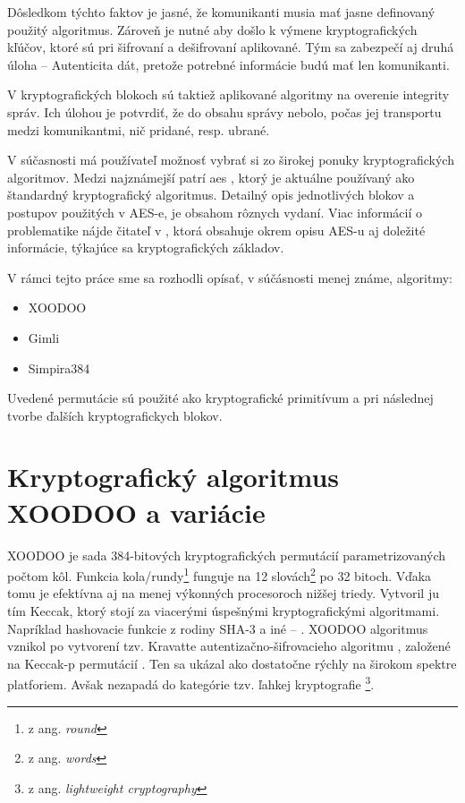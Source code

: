  Dôsledkom týchto faktov je jasné, že komunikanti musia mať jasne definovaný použitý algoritmus. Zároveň je nutné aby došlo k výmene kryptografických kľúčov, ktoré sú pri šifrovaní a dešifrovaní aplikované. Tým sa zabezpečí aj druhá úloha -- Autenticita dát, pretože potrebné informácie budú mať len komunikanti. 
 
 V kryptografických blokoch sú taktiež aplikované algoritmy na overenie integrity správ. Ich úlohou je potvrdiť, že do obsahu správy nebolo, počas jej transportu medzi komunikantmi, nič pridané, resp. ubrané.
 
 V súčasnosti má používateľ možnosť vybrať si zo širokej ponuky kryptografických algoritmov. Medzi najznámejší patrí \acrshort{aes} \cite{aes}, ktorý je aktuálne používaný ako štandardný kryptografický algoritmus. Detailný opis jednotlivých blokov a postupov použitých v AES-e, je obsahom rôznych vydaní. Viac informácií o problematike nájde čitateľ v \cite{levicky}, ktorá obsahuje okrem opisu AES-u aj doležité informácie, týkajúce sa kryptografických základov.

V rámci tejto práce sme sa rozhodli opísať, v súčásnosti menej známe, algoritmy: 
\begin{itemize}
	\item XOODOO \cite{tkecak}
	\item Gimli \cite{gimli}
	\item Simpira384 \cite{simpira}
\end{itemize}  
Uvedené permutácie sú použité ako kryptografické primitívum a pri následnej tvorbe ďalších kryptografickych blokov. 

\section{Kryptografický algoritmus XOODOO a variácie} 
XOODOO je sada 384-bitových kryptografických permutácií parametrizovaných počtom kôl. Funkcia kola/rundy\footnote{z ang. \textit{round}} funguje na 12 slovách\footnote{z ang. \textit{words}} po 32 bitoch. Vďaka tomu je efektívna aj na menej výkonných procesoroch nižšej triedy. Vytvoril ju tím Keccak, ktorý stojí za viacerými úspešnými kryptografickými algoritmami. Napríklad hashovacie funkcie z rodiny SHA-3 a iné -- \cite{kecsup}. XOODOO algoritmus vznikol po vytvorení tzv. Kravatte autentizačno-šifrovacieho algoritmu \cite{kravatte}, založené na Keccak-p permutácií \cite{keccakp}. Ten sa ukázal ako dostatočne rýchly na širokom spektre platforiem. Avšak nezapadá do kategórie tzv. ľahkej kryptografie \footnote{z ang. \textit{lightweight cryptography}}.


